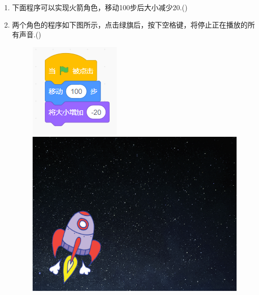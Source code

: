 \documentclass[10pt, a4paper]{article}
\begin{document}
\begin{enumerate}
        \item 下面程序可以实现火箭角色，移动100步后大小减少20.(\qquad)
        
        \item 两个角色的程序如下图所示，点击绿旗后，按下空格键，将停止正在播放的所有声音.(\qquad)
        
        \begin{figure}[htbp]
            \centering
            \begin{minipage}[t]{.25\textwidth}
                \centering
                \begin{minipage}[t]{.38\textwidth}
                    \centering
                    \includegraphics[width=\textwidth]{33-1.png}
                \end{minipage}
                \begin{minipage}[t]{.5\textwidth}
                    \centering
                    \includegraphics[width=\textwidth]{33-2.png}

\end{minipage}
\end{minipage}
\end{figure}
\end{enumerate}
\end{document}
